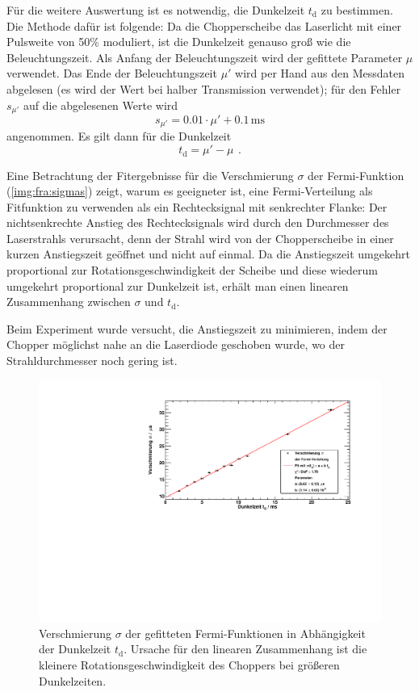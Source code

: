 Für die weitere Auswertung ist es notwendig, die Dunkelzeit $t_\text{d}$ zu bestimmen.
Die Methode dafür ist folgende:
Da die Chopperscheibe das Laserlicht mit einer Pulsweite von 50\% moduliert,
ist die Dunkelzeit genauso groß wie die Beleuchtungszeit.
Als Anfang der Beleuchtungszeit wird der gefittete Parameter $\mu$ verwendet.
Das Ende der Beleuchtungszeit $\mu'$ wird per Hand aus den Messdaten abgelesen
(es wird der Wert bei halber Transmission verwendet);
für den Fehler $s_{\mu'}$ auf die abgelesenen Werte wird
\begin{equation}
    s_{\mu'} = 0.01 \cdot \mu' + 0.1\,\text{ms}
\end{equation}
angenommen.
Es gilt dann für die Dunkelzeit
\begin{equation}
    t_\text{d}=\mu'-\mu \ \, .
\end{equation}

Eine Betrachtung der Fitergebnisse für die Verschmierung $\sigma$ der Fermi-Funktion
(\autoref{img:fra:sigmas}) zeigt,
warum es geeigneter ist, eine Fermi-Verteilung als Fitfunktion zu verwenden als ein
Rechtecksignal mit senkrechter Flanke:
Der nichtsenkrechte Anstieg des Rechtecksignals wird durch den Durchmesser des Laserstrahls verursacht, denn
der Strahl wird von der Chopperscheibe in einer kurzen Anstiegszeit geöffnet und nicht auf einmal.
Da die Anstiegszeit umgekehrt proportional zur Rotationsgeschwindigkeit der Scheibe und diese
wiederum umgekehrt proportional zur Dunkelzeit ist, erhält man einen linearen Zusammenhang
zwischen $\sigma$ und $t_\text{d}$.

Beim Experiment wurde versucht, die Anstiegszeit zu minimieren, indem der Chopper möglichst
nahe an die Laserdiode geschoben wurde, wo der Strahldurchmesser noch gering ist.

\begin{figure}[H]
    \begin{center}
        \includegraphics[width=\textwidth]{../img/part6/sigmaFit.pdf}
        \caption{Verschmierung $\sigma$ der gefitteten Fermi-Funktionen in Abhängigkeit der Dunkelzeit $t_\text{d}$.
        Ursache für den linearen Zusammenhang ist die kleinere Rotationsgeschwindigkeit des Choppers bei
        größeren Dunkelzeiten.}
        \label{img:fra:sigmas}
    \end{center}
\end{figure}

